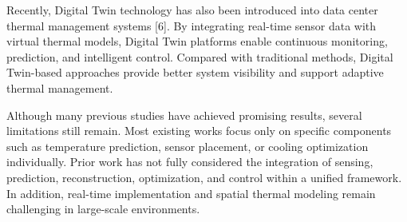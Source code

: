 \documentclass[conference]{IEEEtran}
\begin{document}
Recently, Digital Twin technology has also been introduced into data center thermal management systems [6]. By integrating real-time sensor data with virtual thermal models, Digital Twin platforms enable continuous monitoring, prediction, and intelligent control. Compared with traditional methods, Digital Twin-based approaches provide better system visibility and support adaptive thermal management.

Although many previous studies have achieved promising results, several limitations still remain. Most existing works focus only on specific components such as temperature prediction, sensor placement, or cooling optimization individually. Prior work has not fully considered the integration of sensing, prediction, reconstruction, optimization, and control within a unified framework. In addition, real-time implementation and spatial thermal modeling remain challenging in large-scale environments.









\end{document}
